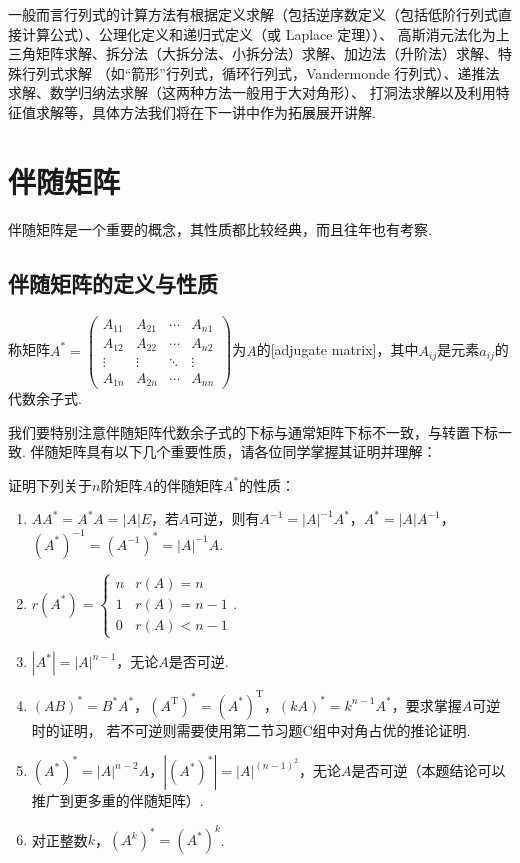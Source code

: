 一般而言行列式的计算方法有根据定义求解（包括逆序数定义（包括低阶行列式直接计算公式）、公理化定义和递归式定义（或 Laplace 定理））、
高斯消元法化为上三角矩阵求解、拆分法（大拆分法、小拆分法）求解、加边法（升阶法）求解、特殊行列式求解
（如``箭形''行列式，循环行列式，Vandermonde 行列式）、递推法求解、数学归纳法求解（这两种方法一般用于大对角形）、
打洞法求解以及利用特征值求解等，具体方法我们将在下一讲中作为拓展展开讲解.

\section{伴随矩阵}
伴随矩阵是一个重要的概念，其性质都比较经典，而且往年也有考察.
\subsection{伴随矩阵的定义与性质}
\begin{definition}
    称矩阵$A^*=\begin{pmatrix}
        A_{11} & A_{21} & \cdots & A_{n1} \\
        A_{12} & A_{22} & \cdots & A_{n2} \\
        \vdots & \vdots & \ddots & \vdots \\
        A_{1n} & A_{2n} & \cdots & A_{nn}
    \end{pmatrix}$为$A$的[adjugate matrix]，其中$A_{ij}$是元素$a_{ij}$的代数余子式.
\end{definition}
我们要特别注意伴随矩阵代数余子式的下标与通常矩阵下标不一致，与转置下标一致.
伴随矩阵具有以下几个重要性质，请各位同学掌握其证明并理解：
\begin{example} \label{ex:11:adjugate}
    证明下列关于$n$阶矩阵$A$的伴随矩阵$A^*$的性质：
    \begin{enumerate}
        \item $AA^*=A^*A=|A|E$，若$A$可逆，则有$A^{-1}=|A|^{-1}A^*$，$A^*=|A|A^{-1}$，$(A^*)^{-1}=(A^{-1})^*=|A|^{-1}A$.

        \item $r(A^*)=\begin{cases}
        n & r(A)=n \\ 1 & r(A)=n-1 \\ 0 & r(A) < n-1
    \end{cases}$.

        \item $|A^*|=|A|^{n-1}$，无论$A$是否可逆.

        \item $(AB)^*=B^*A^*$，$(A^\mathrm{T})^*=(A^*)^\mathrm{T}$，$(kA)^*=k^{n-1}A^*$，要求掌握$A$可逆时的证明，
        若不可逆则需要使用第二节习题C组中对角占优的推论证明.

        \item $(A^*)^*=|A|^{n-2}A$，$|(A^*)^*|=|A|^{(n-1)^2}$，无论$A$是否可逆（本题结论可以推广到更多重的伴随矩阵）.

        \item 对正整数$k$，$(A^k)^*=(A^*)^k$.
    \end{enumerate}
\end{example}

